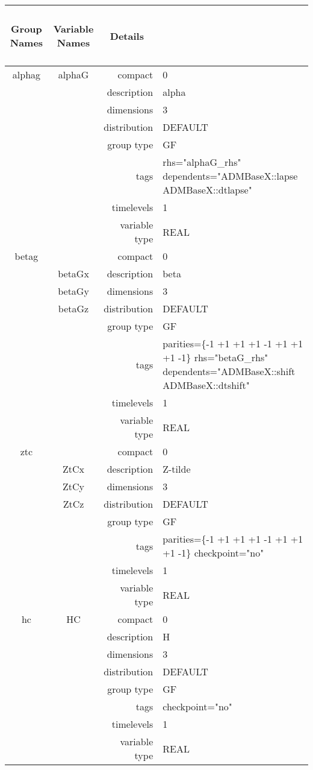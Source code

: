 \begin{tabular*}{150mm}{|c|c@{\extracolsep{\fill}}|rl|} \hline 
~ {\bf Group Names} ~ & ~ {\bf Variable Names} ~  &{\bf Details} ~ & ~ \\ 
\hline 
alphag & alphaG & compact & 0 \\ 
 &  & description & alpha \\ 
 &  & dimensions & 3 \\ 
 &  & distribution & DEFAULT \\ 
 &  & group type & GF \\ 
 &  & tags & rhs="alphaG\_rhs" dependents="ADMBaseX::lapse ADMBaseX::dtlapse" \\ 
 &  & timelevels & 1 \\ 
 &  & variable type & REAL \\ 
\hline 
betag &  & compact & 0 \\ 
 & betaGx & description & beta \\ 
 & betaGy & dimensions & 3 \\ 
 & betaGz & distribution & DEFAULT \\ 
 &  & group type & GF \\ 
 &  & tags & parities=\{-1 +1 +1   +1 -1 +1   +1 +1 -1\} rhs="betaG\_rhs" dependents="ADMBaseX::shift ADMBaseX::dtshift" \\ 
 &  & timelevels & 1 \\ 
 &  & variable type & REAL \\ 
\hline 
ztc &  & compact & 0 \\ 
 & ZtCx & description & Z-tilde \\ 
 & ZtCy & dimensions & 3 \\ 
 & ZtCz & distribution & DEFAULT \\ 
 &  & group type & GF \\ 
 &  & tags & parities=\{-1 +1 +1   +1 -1 +1   +1 +1 -1\} checkpoint="no" \\ 
 &  & timelevels & 1 \\ 
 &  & variable type & REAL \\ 
\hline 
hc & HC & compact & 0 \\ 
 &  & description & H \\ 
 &  & dimensions & 3 \\ 
 &  & distribution & DEFAULT \\ 
 &  & group type & GF \\ 
 &  & tags & checkpoint="no" \\ 
 &  & timelevels & 1 \\ 
 &  & variable type & REAL \\ 

\end{tabular*}
